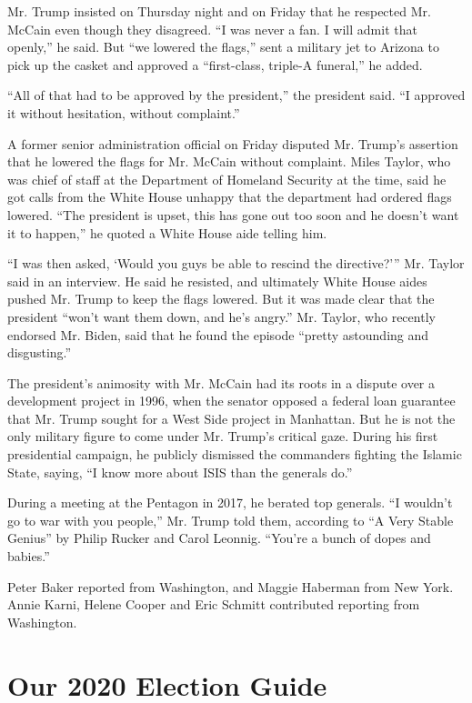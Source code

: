 Mr. Trump insisted on Thursday night and on Friday that he respected Mr.
McCain even though they disagreed. ``I was never a fan. I will admit
that openly,'' he said. But ``we lowered the flags,'' sent a military
jet to Arizona to pick up the casket and approved a ``first-class,
triple-A funeral,'' he added.

``All of that had to be approved by the president,'' the president said.
``I approved it without hesitation, without complaint.''

A former senior administration official on Friday disputed Mr. Trump's
assertion that he lowered the flags for Mr. McCain without complaint.
Miles Taylor, who was chief of staff at the Department of Homeland
Security at the time, said he got calls from the White House unhappy
that the department had ordered flags lowered. ``The president is upset,
this has gone out too soon and he doesn't want it to happen,'' he quoted
a White House aide telling him.

``I was then asked, `Would you guys be able to rescind the directive?'''
Mr. Taylor said in an interview. He said he resisted, and ultimately
White House aides pushed Mr. Trump to keep the flags lowered. But it was
made clear that the president ``won't want them down, and he's angry.''
Mr. Taylor, who recently endorsed Mr. Biden, said that he found the
episode ``pretty astounding and disgusting.''

The president's animosity with Mr. McCain had its roots in a dispute
over a development project in 1996, when the senator opposed a federal
loan guarantee that Mr. Trump sought for a West Side project in
Manhattan. But he is not the only military figure to come under Mr.
Trump's critical gaze. During his first presidential campaign, he
publicly dismissed the commanders fighting the Islamic State, saying,
``I know more about ISIS than the generals do.''

During a meeting at the Pentagon in 2017, he berated top generals. ``I
wouldn't go to war with you people,'' Mr. Trump told them, according to
``A Very Stable Genius'' by Philip Rucker and Carol Leonnig. ``You're a
bunch of dopes and babies.''

Peter Baker reported from Washington, and Maggie Haberman from New York.
Annie Karni, Helene Cooper and Eric Schmitt contributed reporting from
Washington.

\hypertarget{our-2020-election-guide}{%
\section{Our 2020 Election Guide}\label{our-2020-election-guide}}

